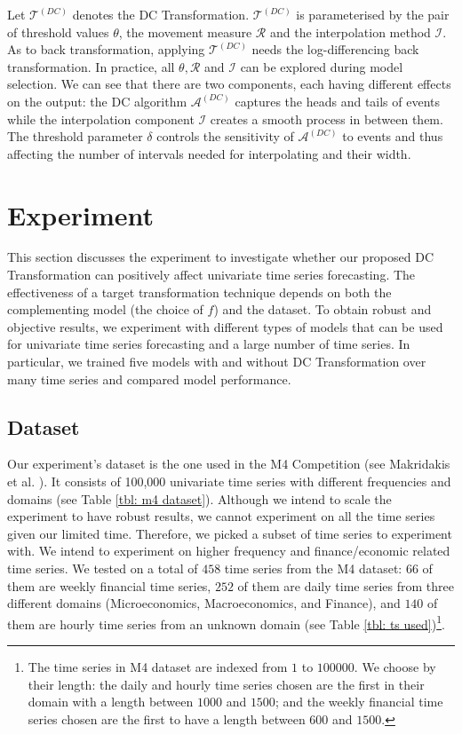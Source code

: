 Let $\mathcal{T}^{(DC)}$ denotes the DC Transformation. $\mathcal{T}^{(DC)}$ is parameterised by the pair of threshold values $\theta$, the movement measure $\mathcal{R}$ and the interpolation method $\mathcal{I}$. As to back transformation, applying $\mathcal{T}^{(DC)}$ needs the log-differencing back transformation. In practice, all $\theta, \mathcal{R}$ and $\mathcal{I}$ can be explored during model selection. We can see that there are two components, each having different effects on the output: the DC algorithm $\mathcal{A}^{(DC)}$ captures the heads and tails of events while the interpolation component $\mathcal{I}$ creates a smooth process in between them. The threshold parameter $\delta$ controls the sensitivity of $\mathcal{A}^{(DC)}$ to events and thus affecting the number of intervals needed for interpolating and their width.

\section{Experiment}\label{sec: experiment}
This section discusses the experiment to investigate whether our proposed DC Transformation can positively affect univariate time series forecasting. The effectiveness of a target transformation technique depends on both the complementing model (the choice of $f$) and the dataset. To obtain robust and objective results, we experiment with different types of models that can be used for univariate time series forecasting and a large number of time series. In particular, we trained five models with and without DC Transformation over many time series and compared model performance.

\subsection{Dataset}
Our experiment's dataset is the one used in the M4 Competition (see Makridakis et al. \citeyear{MAKRIDAKIS202054}). It consists of 100,000 univariate time series with different frequencies and domains (see Table \ref{tbl: m4 dataset}). Although we intend to scale the experiment to have robust results, we cannot experiment on all the time series given our limited time. Therefore, we picked a subset of time series to experiment with. We intend to experiment on higher frequency and finance/economic related time series. We tested on a total of $458$ time series from the M4 dataset: $66$ of them are weekly financial time series, $252$ of them are daily time series from three different domains (Microeconomics, Macroeconomics, and Finance), and $140$ of them are hourly time series from an unknown domain (see Table \ref{tbl: ts used})\footnote{The time series in M4 dataset are indexed from $1$ to $100000$. We choose by their length: the daily and hourly time series chosen are the first in their domain with a length between $1000$ and $1500$; and the weekly financial time series chosen are the first to have a length between $600$ and $1500$.}.

